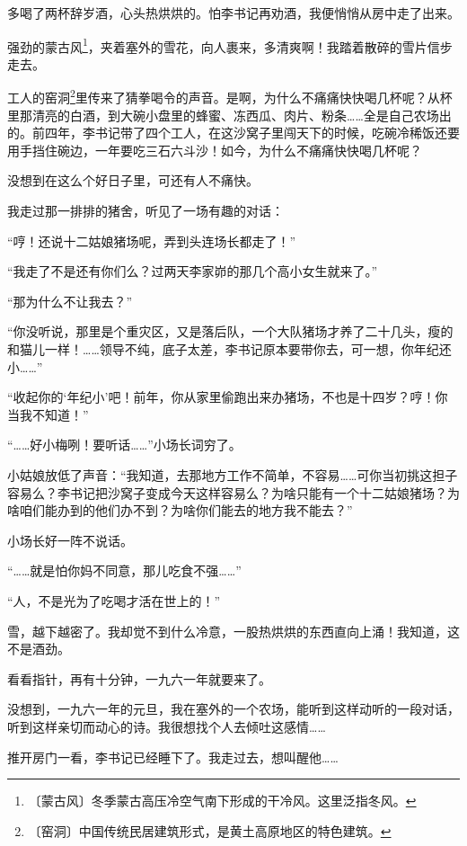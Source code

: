 \documentclass[12pt,UTF-8,openany]{ctexbook}
\begin{document}
\begin{normalsize}
    
    多喝了两杯辞岁酒，心头热烘烘的。怕李书记再劝酒，我便悄悄从房中走了出来。
    
    强劲的蒙古风\footnote{〔蒙古风〕冬季蒙古高压冷空气南下形成的干冷风。这里泛指冬风。}，夹着塞外的雪花，向人裹来，多清爽啊！我踏着散碎的雪片信步走去。
    
    工人的窑洞\footnote{〔窑洞〕中国传统民居建筑形式，是黄土高原地区的特色建筑。}里传来了猜拳喝令的声音。是啊，为什么不痛痛快快喝几杯呢？从杯里那清亮的白酒，到大碗小盘里的蜂蜜、冻西瓜、肉片、粉条……全是自己农场出的。前四年，李书记带了四个工人，在这沙窝子里闯天下的时候，吃碗冷稀饭还要用手挡住碗边，一年要吃三石六斗沙！如今，为什么不痛痛快快喝几杯呢？
    
    没想到在这么个好日子里，可还有人不痛快。
    
    我走过那一排排的猪舍，听见了一场有趣的对话：
    
    “哼！还说十二姑娘猪场呢，弄到头连场长都走了！”
    
    “我走了不是还有你们么？过两天李家峁的那几个高小女生就来了。”
    
    “那为什么不让我去？”
    
    “你没听说，那里是个重灾区，又是落后队，一个大队猪场才养了二十几头，瘦的和猫儿一样！……领导不纯，底子太差，李书记原本要带你去，可一想，你年纪还小……”
    
    “收起你的‘年纪小’吧！前年，你从家里偷跑出来办猪场，不也是十四岁？哼！你当我不知道！”
    
    “……好小梅咧！要听话……”小场长词穷了。
    
    小姑娘放低了声音：“我知道，去那地方工作不简单，不容易……可你当初挑这担子容易么？李书记把沙窝子变成今天这样容易么？为啥只能有一个十二姑娘猪场？为啥咱们能办到的他们办不到？为啥你们能去的地方我不能去？”
    
    小场长好一阵不说话。
    
    “……就是怕你妈不同意，那儿吃食不强……”
    
    “人，不是光为了吃喝才活在世上的！”
    
    雪，越下越密了。我却觉不到什么冷意，一股热烘烘的东西直向上涌！我知道，这不是酒劲。
    
    看看指针，再有十分钟，一九六一年就要来了。
    
    没想到，一九六一年的元旦，我在塞外的一个农场，能听到这样动听的一段对话，听到这样亲切而动心的诗。我很想找个人去倾吐这感情……
    
    推开房门一看，李书记已经睡下了。我走过去，想叫醒他……
    

\end{normalsize}
\end{document}
